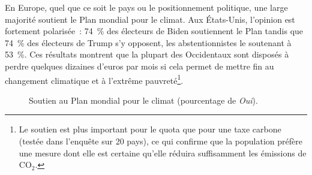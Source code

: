 \documentclass[a5paper,french,openany]{memoir}
\begin{document}
En Europe, quel que ce soit le pays ou le positionnement politique, une large majorité soutient le Plan mondial pour le climat. 
Aux États-Unis, l'opinion est fortement polarisée~: 74~\% des électeurs de Biden soutiennent le Plan tandis que 74~\% des électeurs de Trump s'y opposent, les abstentionnistes le soutenant à 53~\%.  
Ces résultats montrent que la plupart des Occidentaux sont disposés à perdre quelques dizaines d'euros par mois si cela permet de mettre fin au changement climatique et à l'extrême pauvreté\footnote{Le soutien est plus important pour le quota que pour une taxe carbone (testée dans l'enquête sur 20 pays), ce qui confirme que la population préfère une mesure dont elle est certaine qu'elle réduira suffisamment les émissions de CO$_\text{2}$.}. 

\begin{figure}[h!]
  \caption[Soutien au Plan mondial pour le climat]{Soutien au Plan mondial pour le climat (pourcentage de \textit{Oui}).} 
  \label{fig:gcs_support} 
\end{figure}
\end{document}
